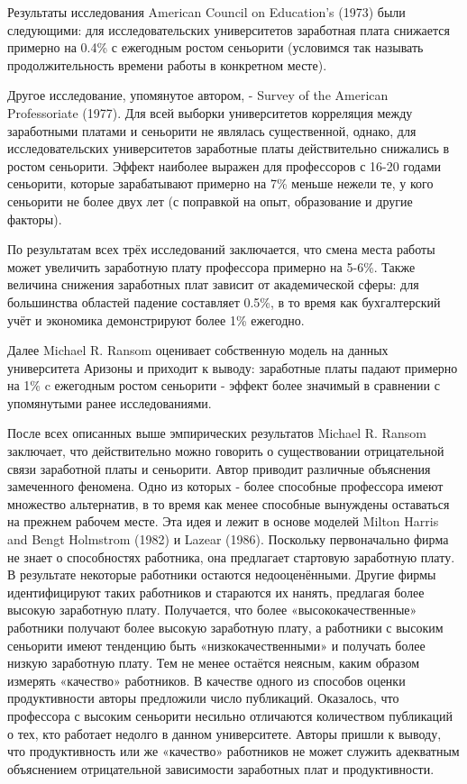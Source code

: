 \documentclass[a4paper, 12pt]{article}
\theoremstyle{definition}
\theoremstyle{plain}
\begin{document}
	Результаты исследования American Council on Education's (1973) были следующими:  для исследовательских университетов заработная плата снижается примерно на 0.4\% с ежегодным ростом сеньорити (условимся так называть продолжительность времени работы в конкретном месте). 
	
	Другое исследование, упомянутое автором, - Survey of the American Professoriate (1977). Для всей выборки университетов корреляция между заработными платами и сеньорити не являлась существенной, однако, для исследовательских университетов заработные платы действительно снижались в ростом сеньорити. Эффект наиболее выражен для профессоров с 16-20 годами сеньорити, которые зарабатывают примерно на 7\% меньше нежели те, у кого сеньорити не более двух лет (с поправкой на опыт, образование и другие факторы). 
	
	По результатам всех трёх исследований заключается, что смена места работы может увеличить заработную плату профессора примерно на 5-6\%. Также величина снижения заработных плат зависит от академической сферы: для большинства областей падение составляет 0.5\%, в то время как бухгалтерский учёт и экономика демонстрируют более 1\% ежегодно. 
	
	Далее Michael R. Ransom оценивает собственную модель на данных университета Аризоны и приходит к выводу: заработные платы падают примерно на 1\% c ежегодным ростом сеньорити - эффект более значимый в сравнении с упомянутыми ранее исследованиями. 
	
	После всех описанных выше эмпирических результатов Michael R. Ransom заключает, что действительно можно говорить о существовании отрицательной связи заработной платы и сеньорити. Автор приводит различные объяснения замеченного феномена. Одно из которых - более способные профессора имеют множество альтернатив, в то время как менее способные вынуждены оставаться на прежнем рабочем месте. Эта идея и лежит в основе моделей Milton Harris and Bengt Holmstrom (1982) и Lazear (1986). Поскольку первоначально фирма не знает о способностях работника, она предлагает стартовую заработную плату. В результате некоторые работники остаются недооценёнными. Другие фирмы идентифицируют таких работников и стараются их нанять, предлагая более высокую заработную плату. Получается, что более «высококачественные» работники получают более высокую заработную плату, а работники с высоким сеньорити имеют тенденцию быть «низкокачественными» и получать более низкую заработную плату. Тем не менее остаётся неясным, каким образом измерять «качество» работников. В качестве одного из способов оценки продуктивности авторы предложили число публикаций. Оказалось, что профессора с высоким сеньорити несильно отличаются количеством публикаций о тех, кто работает недолго в данном университете. Авторы пришли к выводу, что продуктивность или же «качество» работников не может служить адекватным объяснением отрицательной зависимости заработных плат и продуктивности.
	
\end{document}
